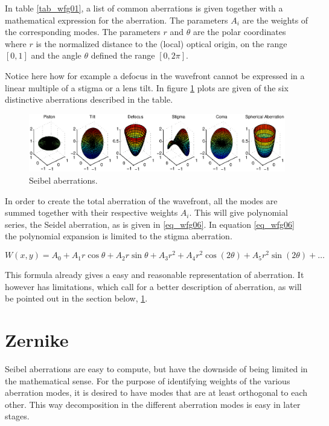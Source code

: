 \documentclass{article}
\begin{document}
In table \ref{tab_wfg01}, a list of common aberrations is given together with a mathematical expression for the aberration. The parameters $A_i$ are the weights of the corresponding modes. The parameters $r$ and $\theta$ are the polar coordinates where $r$ is the normalized distance to the (local) optical origin, on the range $[0,1]$ and the angle $\theta$ defined the range $[0,2\pi]$.

Notice here how for example a defocus in the wavefront cannot be expressed in a linear multiple of a stigma or a lens tilt. In figure \ref{fig_wfg01} plots are given of the six distinctive aberrations described in the table.

\begin{figure}[H]
	\center
	\includegraphics[width=1.05\textwidth, height=.2\textwidth]{Figures/Seibel.eps}
	\caption{Seibel aberrations.}
	\label{fig_wfg01}
\end{figure}

In order to create the total aberration of the wavefront, all the modes are summed together with their respective weights $A_i$. This will give polynomial series, the Seidel aberration, as is given in \ref{eq_wfg06}. In equation \ref{eq_wfg06} the polynomial expansion is limited to the stigma aberration.

\begin{equation}
\label{eq_wfg06}
W(x,y) = A_0 + A_1 r \cos \theta + A_2 r \sin \theta + A_3 r^2 + A_4 r^2 \cos(2\theta) + A_5 r^2 \sin(2\theta) + \dots
\end{equation}

This formula already gives a easy and reasonable representation of aberration. It however has limitations, which call for a better description of aberration, as will be pointed out in the section below, \ref{sec_wfgZer}.

\section{Zernike}
\label{sec_wfgZer}
Seibel aberrations are easy to compute, but have the downside of being limited in the mathematical sense. For the purpose of identifying weights of the various aberration modes, it is desired to have modes that are at least orthogonal to each other. This way decomposition in the different aberration modes is easy in later stages.
\end{document}
